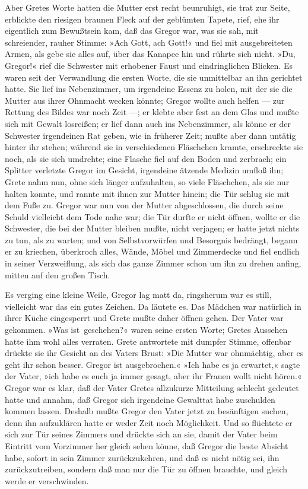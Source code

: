 Aber Gretes Worte hatten die Mutter erst recht beunruhigt, sie trat zur
Seite, erblickte den riesigen braunen Fleck auf der geblümten Tapete,
rief, ehe ihr eigentlich zum Bewußtsein kam, daß das Gregor war, was sie
sah, mit schreiender, rauher Stimme: »Ach Gott, ach Gott!« und fiel mit
ausgebreiteten Armen, als gebe sie alles auf, über das Kanapee hin und
rührte sich nicht. »Du, Gregor!« rief die Schwester mit erhobener Faust
und eindringlichen Blicken. Es waren seit der Verwandlung die ersten
Worte, die sie unmittelbar an ihn gerichtet hatte. Sie lief ins
Nebenzimmer, um irgendeine Essenz zu holen, mit der sie die Mutter aus
ihrer Ohnmacht wecken könnte; Gregor wollte auch helfen --- zur Rettung
des Bildes war noch Zeit ---; er klebte aber fest an dem Glas und mußte
sich mit Gewalt losreißen; er lief dann auch ins Nebenzimmer, als könne
er der Schwester irgendeinen Rat geben, wie in früherer Zeit; mußte aber
dann untätig hinter ihr stehen; während sie in verschiedenen Fläschchen
kramte, erschreckte sie noch, als sie sich umdrehte; eine Flasche fiel
auf den Boden und zerbrach; ein Splitter verletzte Gregor im Gesicht,
irgendeine ätzende Medizin umfloß ihn; Grete nahm nun, ohne sich länger
aufzuhalten, so viele Fläschchen, als sie nur halten konnte, und rannte
mit ihnen zur Mutter hinein; die Tür schlug sie mit dem Fuße zu. Gregor
war nun von der Mutter abgeschlossen, die durch seine Schuld vielleicht
dem Tode nahe war; die Tür durfte er nicht öffnen, wollte er die
Schwester, die bei der Mutter bleiben mußte, nicht verjagen; er hatte
jetzt nichts zu tun, als zu warten; und von Selbstvorwürfen und
Besorgnis bedrängt, begann er zu kriechen, überkroch alles, Wände,
Möbel und Zimmerdecke und fiel endlich in seiner Verzweiflung, als sich
das ganze Zimmer schon um ihn zu drehen anfing, mitten auf den großen
Tisch.

Es verging eine kleine Weile, Gregor lag matt da, ringsherum war es
still, vielleicht war das ein gutes Zeichen. Da läutete es. Das Mädchen
war natürlich in ihrer Küche eingesperrt und Grete mußte daher öffnen
gehen. Der Vater war gekommen. »Was ist\est\ geschehen?« waren seine ersten
Worte; Gretes Aussehen hatte ihm wohl alles verraten. Grete antwortete
mit dumpfer Stimme, offenbar drückte sie ihr Gesicht an des Vaters
Brust: »Die Mutter war ohnmächtig, aber es geht ihr schon besser. Gregor
ist ausgebrochen.« »Ich habe es ja erwartet,« sagte der Vater, »ich habe
es euch ja immer gesagt, aber ihr Frauen wollt nicht hören.« Gregor war
es klar, daß der Vater Gretes allzukurze Mitteilung schlecht gedeutet
hatte und annahm, daß Gregor sich irgendeine Gewalttat habe zuschulden
kommen lassen. Deshalb mußte Gregor den Vater jetzt zu besänftigen
suchen, denn ihn aufzuklären hatte er weder Zeit noch Möglichkeit. Und
so flüchtete er sich zur Tür seines Zimmers und drückte sich an sie,
damit der Vater beim Eintritt vom Vorzimmer her gleich sehen könne, daß
Gregor die beste Absicht habe, sofort in sein Zimmer zurückzukehren, und
daß es nicht nötig sei, ihn zurückzutreiben, sondern daß man nur die Tür
zu öffnen brauchte, und gleich werde er verschwinden.

